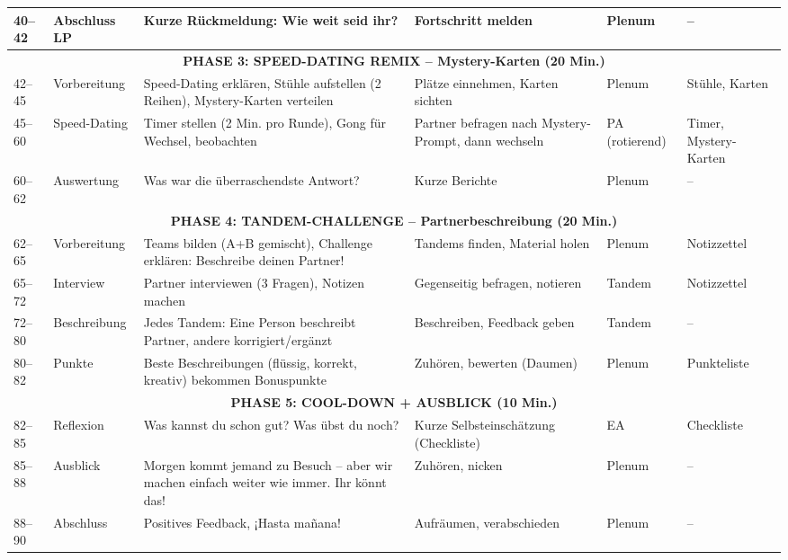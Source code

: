 \documentclass[11pt,a4paper]{article}
\begin{document}
\begin{longtable}{|p{0.8cm}|p{1.5cm}|p{4cm}|p{3cm}|p{1.5cm}|p{2cm}|}
40--42 & Abschluss LP & Kurze Rückmeldung: \glqq{}Wie weit seid ihr?\grqq{} & Fortschritt melden & Plenum & -- \\
\hline

\multicolumn{6}{|c|}{\textbf{PHASE 3: SPEED-DATING REMIX -- Mystery-Karten (20 Min.)}} \\
\hline

42--45 & Vorbereitung & Speed-Dating erklären, Stühle aufstellen (2 Reihen), Mystery-Karten verteilen & Plätze einnehmen, Karten sichten & Plenum & Stühle, Karten \\
\hline

45--60 & Speed-Dating & Timer stellen (2 Min. pro Runde), Gong für Wechsel, beobachten & Partner befragen nach Mystery-Prompt, dann wechseln & PA (rotierend) & Timer, Mystery-Karten \\
\hline

60--62 & Auswertung & \glqq{}Was war die überraschendste Antwort?\grqq{} & Kurze Berichte & Plenum & -- \\
\hline

\multicolumn{6}{|c|}{\textbf{PHASE 4: TANDEM-CHALLENGE -- Partnerbeschreibung (20 Min.)}} \\
\hline

62--65 & Vorbereitung & Teams bilden (A+B gemischt), Challenge erklären: \glqq{}Beschreibe deinen Partner!\grqq{} & Tandems finden, Material holen & Plenum & Notizzettel \\
\hline

65--72 & Interview & Partner interviewen (3 Fragen), Notizen machen & Gegenseitig befragen, notieren & Tandem & Notizzettel \\
\hline

72--80 & Beschreibung & Jedes Tandem: Eine Person beschreibt Partner, andere korrigiert/ergänzt & Beschreiben, Feedback geben & Tandem & -- \\
\hline

80--82 & Punkte & Beste Beschreibungen (flüssig, korrekt, kreativ) bekommen Bonuspunkte & Zuhören, bewerten (Daumen) & Plenum & Punkteliste \\
\hline

\multicolumn{6}{|c|}{\textbf{PHASE 5: COOL-DOWN + AUSBLICK (10 Min.)}} \\
\hline

82--85 & Reflexion & \glqq{}Was kannst du schon gut? Was übst du noch?\grqq{} & Kurze Selbsteinschätzung (Checkliste) & EA & Checkliste \\
\hline

85--88 & Ausblick & \glqq{}Morgen kommt jemand zu Besuch -- aber wir machen einfach weiter wie immer. Ihr könnt das!\grqq{} & Zuhören, nicken & Plenum & -- \\
\hline

88--90 & Abschluss & Positives Feedback, \glqq{}¡Hasta mañana!\grqq{} & Aufräumen, verabschieden & Plenum & -- \\
\hline

\end{longtable}
\end{document}
